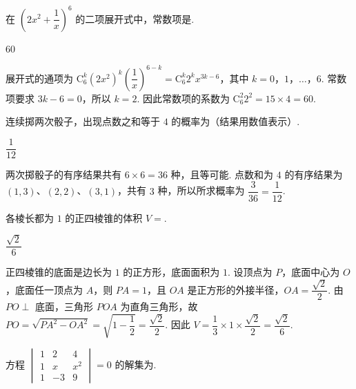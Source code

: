 \begin{problem}
在 \(\left(2x^2+\dfrac{1}{x}\right)^6\) 的二项展开式中，常数项是\fillinblank{}.
\end{problem}

\begin{answer}
\(60\)
\end{answer}

\begin{solution}
展开式的通项为 \(\mathrm C_6^k(2x^2)^k\left(\dfrac{1}{x}\right)^{6-k}=\mathrm C_6^k2^kx^{3k-6}\)，其中 \(k=0\)，\(1\)，\(\ldots\)，\(6\). 常数项要求 \(3k-6=0\)，所以 \(k=2\). 因此常数项的系数为 \(\mathrm C_6^2 2^2=15\times4=60\).
\end{solution}

\begin{problem}
连续掷两次骰子，出现点数之和等于 \(4\) 的概率为\fillinblank{}（结果用数值表示）.
\end{problem}

\begin{answer}
\(\dfrac{1}{12}\)
\end{answer}

\begin{solution}
两次掷骰子的有序结果共有 \(6\times6=36\) 种，且等可能. 点数和为 \(4\) 的有序结果为 \((1,3)\)、\((2,2)\)、\((3,1)\)，共有 \(3\) 种，所以所求概率为 \(\dfrac{3}{36}=\dfrac{1}{12}\).
\end{solution}

\begin{problem}
各棱长都为 \(1\) 的正四棱锥的体积 \(V=\)\fillinblank{}.
\end{problem}

\begin{answer}
\(\dfrac{\sqrt{2}}{6}\)
\end{answer}

\begin{solution}
正四棱锥的底面是边长为 \(1\) 的正方形，底面面积为 \(1\). 设顶点为 \(P\)，底面中心为 \(O\)，底面任一顶点为 \(A\)，则 \(PA=1\)，且 \(OA\) 是正方形的外接半径，\(OA=\dfrac{\sqrt{2}}{2}\). 由 \(PO\perp\) 底面，三角形 \(POA\) 为直角三角形，故 \(PO=\sqrt{PA^2-OA^2}=\sqrt{1-\dfrac12}=\dfrac{\sqrt2}{2}\). 因此 \(V=\dfrac13\times1\times\dfrac{\sqrt2}{2}=\dfrac{\sqrt2}{6}\).
\end{solution}

\begin{problem}
方程 \(\begin{vmatrix}1 & 2 & 4 \\ 1 & x & x^2 \\ 1 & -3 & 9\end{vmatrix}=0\) 的解集为\fillinblank{}.
\end{problem}

